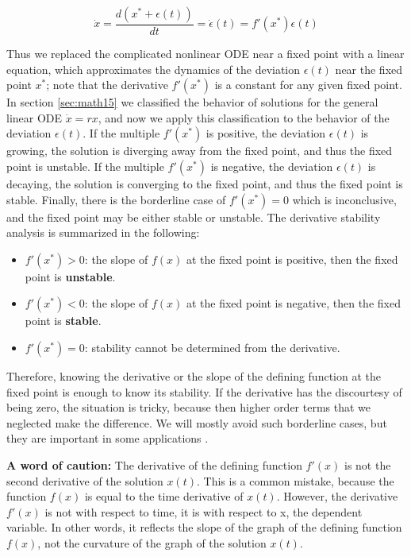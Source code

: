\documentclass[
]{book}
\providecommand{\tightlist}{%
  \setlength{\itemsep}{0pt}\setlength{\parskip}{0pt}}
\theoremstyle{definition}
\theoremstyle{definition}
\theoremstyle{definition}
\theoremstyle{remark}
\begin{document}
\[ \dot x =  \frac{d(x^* + \epsilon(t))}{dt} = \dot \epsilon(t) =  f'(x^*) \epsilon(t)\]

Thus we replaced the complicated nonlinear ODE near a fixed point with a linear equation, which approximates the dynamics of the deviation \(\epsilon(t)\) near the fixed point \(x^*\); note that the derivative \(f'(x^*)\) is a constant for any given fixed point. In section \ref{sec:math15} we classified the behavior of solutions for the general linear ODE \(\dot x = rx\), and now we apply this classification to the behavior of the deviation \(\epsilon(t)\). If the multiple \(f'(x^*)\) is positive, the deviation \(\epsilon(t)\) is growing, the solution is diverging away from the fixed point, and thus the fixed point is unstable. If the multiple \(f'(x^*)\) is negative, the deviation \(\epsilon(t)\) is decaying, the solution is converging to the fixed point, and thus the fixed point is stable. Finally, there is the borderline case of \(f'(x^*) = 0\) which is inconclusive, and the fixed point may be either stable or unstable. The  derivative stability analysis is summarized in the following:

\begin{itemize}
\tightlist
\item
  \(f'(x^*) > 0\): the slope of \(f(x)\) at the fixed point is positive, then the fixed point is \textbf{unstable}.
\item
  \(f'(x^*) < 0\): the slope of \(f(x)\) at the fixed point is negative, then the fixed point is \textbf{stable}.
\item
  \(f'(x^*) = 0\): stability cannot be determined from the derivative.
\end{itemize}

Therefore, knowing the derivative or the slope of the defining function at the fixed point is enough to know its stability. If the derivative has the discourtesy of being zero, the situation is tricky, because then higher order terms that we neglected make the difference. We will mostly avoid such borderline cases, but they are important in some applications \citep{strogatz_nonlinear_2001}.

\textbf{A word of caution:} The derivative of the defining function \(f'(x)\) is not the second derivative of the solution \(x(t)\). This is a common mistake, because the function \(f(x)\) is equal to the time derivative of \(x(t)\). However, the derivative \(f'(x)\) is not with respect to time, it is with respect to x, the dependent variable. In other words, it reflects the slope of the graph of the defining function \(f(x)\), not the curvature of the graph of the solution \(x(t)\).
\end{document}
